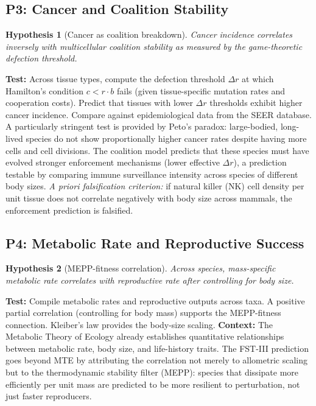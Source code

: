 \documentclass[12pt,a4paper]{article}
\newtheorem{hypothesis}{Hypothesis}
\theoremstyle{remark}
\begin{document}
\subsection{P3: Cancer and Coalition Stability}

\begin{hypothesis}[Cancer as coalition breakdown]
Cancer incidence correlates inversely with multicellular coalition stability as measured by the game-theoretic defection threshold.
\end{hypothesis}

\textbf{Test:} Across tissue types, compute the defection threshold $\Delta r$ at which Hamilton's condition $c < r \cdot b$ fails (given tissue-specific mutation rates and cooperation costs). Predict that tissues with lower $\Delta r$ thresholds exhibit higher cancer incidence. Compare against epidemiological data from the SEER database. A particularly stringent test is provided by Peto's paradox: large-bodied, long-lived species do not show proportionally higher cancer rates despite having more cells and cell divisions. The coalition model predicts that these species must have evolved stronger enforcement mechanisms (lower effective $\Delta r$), a prediction testable by comparing immune surveillance intensity across species of different body sizes. \textit{A priori falsification criterion:} if natural killer (NK) cell density per unit tissue does not correlate negatively with body size across mammals, the enforcement prediction is falsified.

\subsection{P4: Metabolic Rate and Reproductive Success}

\begin{hypothesis}[MEPP-fitness correlation]
Across species, mass-specific metabolic rate correlates with reproductive rate after controlling for body size.
\end{hypothesis}

\textbf{Test:} Compile metabolic rates and reproductive outputs across taxa. A positive partial correlation (controlling for body mass) supports the MEPP-fitness connection. Kleiber's law provides the body-size scaling. \textbf{Context:} The Metabolic Theory of Ecology \citep{BrownMTE2004} already establishes quantitative relationships between metabolic rate, body size, and life-history traits. The FST-III prediction goes beyond MTE by attributing the correlation not merely to allometric scaling but to the thermodynamic stability filter (MEPP): species that dissipate more efficiently per unit mass are predicted to be more resilient to perturbation, not just faster reproducers.
\end{document}

